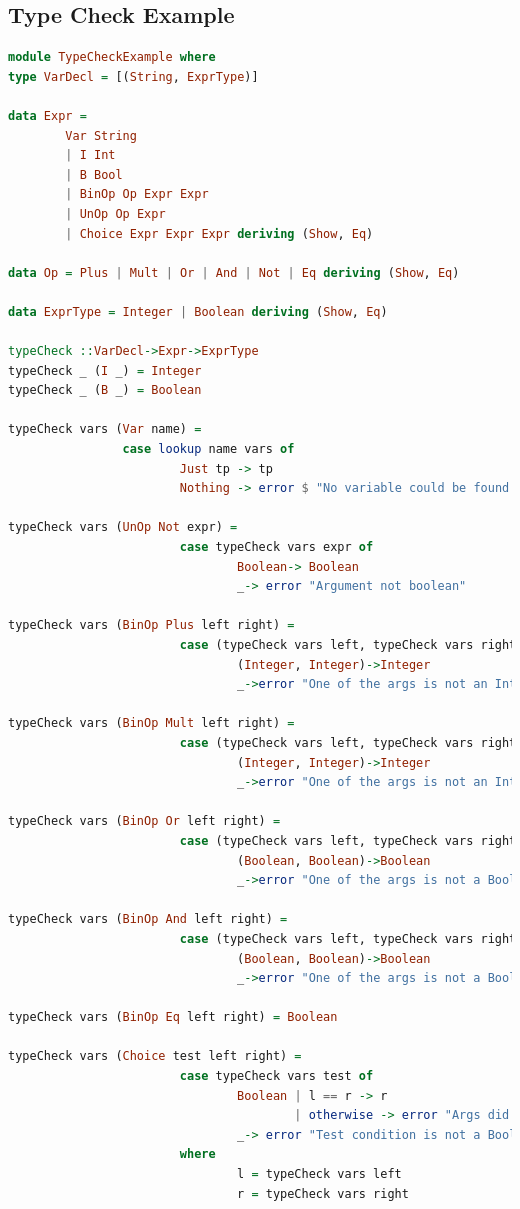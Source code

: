 \documentclass[tikz, border=5mm]{article}
\begin{document}
    \subsection{Type Check Example}
    \begin{lstlisting}[language=Haskell]
module TypeCheckExample where
type VarDecl = [(String, ExprType)]

data Expr = 
        Var String
        | I Int
        | B Bool
        | BinOp Op Expr Expr
        | UnOp Op Expr
        | Choice Expr Expr Expr deriving (Show, Eq)
            
data Op = Plus | Mult | Or | And | Not | Eq deriving (Show, Eq)

data ExprType = Integer | Boolean deriving (Show, Eq)

typeCheck ::VarDecl->Expr->ExprType
typeCheck _ (I _) = Integer
typeCheck _ (B _) = Boolean

typeCheck vars (Var name) = 
                case lookup name vars of
                        Just tp -> tp
                        Nothing -> error $ "No variable could be found named "++name

typeCheck vars (UnOp Not expr) = 
                        case typeCheck vars expr of
                                Boolean-> Boolean 
                                _-> error "Argument not boolean"

typeCheck vars (BinOp Plus left right) = 
                        case (typeCheck vars left, typeCheck vars right) of
                                (Integer, Integer)->Integer
                                _->error "One of the args is not an Integer"

typeCheck vars (BinOp Mult left right) = 
                        case (typeCheck vars left, typeCheck vars right) of
                                (Integer, Integer)->Integer
                                _->error "One of the args is not an Integer"

typeCheck vars (BinOp Or left right) = 
                        case (typeCheck vars left, typeCheck vars right) of
                                (Boolean, Boolean)->Boolean
                                _->error "One of the args is not a Boolean"

typeCheck vars (BinOp And left right) = 
                        case (typeCheck vars left, typeCheck vars right) of
                                (Boolean, Boolean)->Boolean
                                _->error "One of the args is not a Boolean"

typeCheck vars (BinOp Eq left right) = Boolean

typeCheck vars (Choice test left right) = 
                        case typeCheck vars test of
                                Boolean | l == r -> r
                                        | otherwise -> error "Args did not match"
                                _-> error "Test condition is not a Boolean"
                        where
                                l = typeCheck vars left
                                r = typeCheck vars right
    \end{lstlisting}
\end{document}
